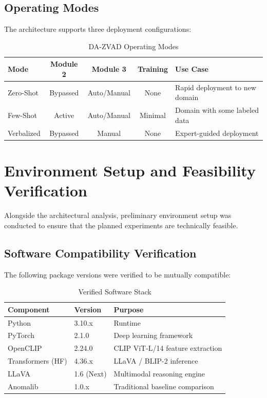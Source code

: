 \documentclass[12pt, a4paper]{article}
\begin{document}
\subsection{Operating Modes}

The architecture supports three deployment configurations:

\begin{table}[h!]
\centering
\caption{DA-ZVAD Operating Modes}
\label{tab:modes}
\renewcommand{\arraystretch}{1.3}
\begin{tabular}{@{} l c c c l @{}}
\toprule
\textbf{Mode} & \textbf{Module 2} & \textbf{Module 3} & \textbf{Training} & \textbf{Use Case} \\
\midrule
Zero-Shot & Bypassed & Auto/Manual & None & Rapid deployment to new domain \\
Few-Shot & Active & Auto/Manual & Minimal & Domain with some labeled data \\
Verbalized & Bypassed & Manual & None & Expert-guided deployment \\
\bottomrule
\end{tabular}
\end{table}

\section{Environment Setup and Feasibility Verification}

Alongside the architectural analysis, preliminary environment setup was conducted to ensure that the planned experiments are technically feasible.

\subsection{Software Compatibility Verification}

The following package versions were verified to be mutually compatible:

\begin{table}[h!]
\centering
\caption{Verified Software Stack}
\label{tab:software}
\renewcommand{\arraystretch}{1.2}
\begin{tabular}{@{} l l l @{}}
\toprule
\textbf{Component} & \textbf{Version} & \textbf{Purpose} \\
\midrule
Python & 3.10.x & Runtime \\
PyTorch & 2.1.0 & Deep learning framework \\
OpenCLIP & 2.24.0 & CLIP ViT-L/14 feature extraction \\
Transformers (HF) & 4.36.x & LLaVA / BLIP-2 inference \\
LLaVA & 1.6 (Next) & Multimodal reasoning engine \\
Anomalib & 1.0.x & Traditional baseline comparison \\
\bottomrule
\end{tabular}
\end{table}
\end{document}
